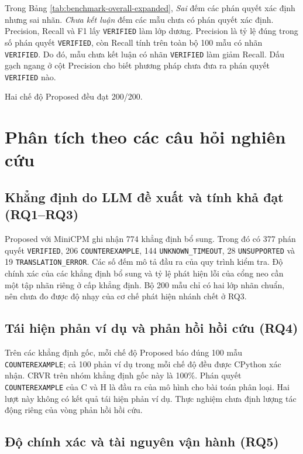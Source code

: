 Trong Bảng \ref{tab:benchmark-overall-expanded}, \emph{Sai} đếm các phán quyết xác định nhưng sai nhãn. \emph{Chưa kết luận} đếm các mẫu chưa có phán quyết xác định. Precision, Recall và F1 lấy \texttt{VERIFIED} làm lớp dương. Precision là tỷ lệ đúng trong số phán quyết \texttt{VERIFIED}, còn Recall tính trên toàn bộ 100 mẫu có nhãn \texttt{VERIFIED}. Do đó, mẫu chưa kết luận có nhãn \texttt{VERIFIED} làm giảm Recall. Dấu gạch ngang ở cột Precision cho biết phương pháp chưa đưa ra phán quyết \texttt{VERIFIED} nào.

Hai chế độ Proposed đều đạt 200/200.

\section{Phân tích theo các câu hỏi nghiên cứu}
\label{sec:research_question_results}

\subsection{Khẳng định do LLM đề xuất và tính khả đạt (RQ1--RQ3)}

Proposed với MiniCPM ghi nhận 774 khẳng định bổ sung. Trong đó có 377 phán quyết \texttt{VERIFIED}, 206 \texttt{COUNTEREXAMPLE}, 144 \texttt{UNKNOWN\_TIMEOUT}, 28 \texttt{UNSUPPORTED} và 19 \texttt{TRANSLATION\_ERROR}. Các số đếm mô tả đầu ra của quy trình kiểm tra. Độ chính xác của các khẳng định bổ sung và tỷ lệ phát hiện lỗi của cổng neo cần một tập nhãn riêng ở cấp khẳng định. Bộ 200 mẫu chỉ có hai lớp nhãn chuẩn, nên chưa đo được độ nhạy của cơ chế phát hiện nhánh chết ở RQ3.

\subsection{Tái hiện phản ví dụ và phản hồi hồi cứu (RQ4)}
\label{sec:crvr_deep_dive}

Trên các khẳng định gốc, mỗi chế độ Proposed báo đúng 100 mẫu \texttt{COUNTEREXAMPLE}; cả 100 phản ví dụ trong mỗi chế độ đều được CPython xác nhận. CRVR trên nhóm khẳng định gốc này là 100\%. Phán quyết \texttt{COUNTEREXAMPLE} của C và H là đầu ra của mô hình cho bài toán phân loại. Hai lượt này không có kết quả tái hiện phản ví dụ. Thực nghiệm chưa định lượng tác động riêng của vòng phản hồi hồi cứu.

\subsection{Độ chính xác và tài nguyên vận hành (RQ5)}
\label{sec:cost_latency_tradeoffs}


